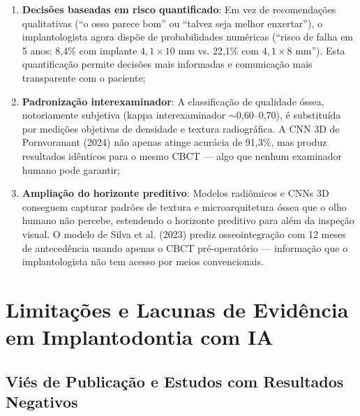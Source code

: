 \begin{enumerate}
    \item \textbf{Decisões baseadas em risco quantificado}: Em vez de recomendações qualitativas (``o osso parece bom'' ou ``talvez seja melhor enxertar''), o implantologista agora dispõe de probabilidades numéricas (``risco de falha em 5 anos: 8,4\% com implante $4,1 \times 10$ mm vs. 22,1\% com $4,1 \times 8$ mm''). Esta quantificação permite decisões mais informadas e comunicação mais transparente com o paciente;

    \item \textbf{Padronização interexaminador}: A classificação de qualidade óssea, notoriamente subjetiva (kappa interexaminador $\sim$0,60--0,70), é substituída por medições objetivas de densidade e textura radiográfica. A CNN 3D de Pornvoranant (2024) não apenas atinge acurácia de 91,3\%, mas produz resultados idênticos para o mesmo CBCT --- algo que nenhum examinador humano pode garantir;

    \item \textbf{Ampliação do horizonte preditivo}: Modelos radiômicos e CNNs 3D conseguem capturar padrões de textura e microarquitetura óssea que o olho humano não percebe, estendendo o horizonte preditivo para além da inspeção visual. O modelo de Silva et al. (2023) prediz osseointegração com 12 meses de antecedência usando apenas o CBCT pré-operatório --- informação que o implantologista não tem acesso por meios convencionais.
\end{enumerate}


\section{Limitações e Lacunas de Evidência em Implantodontia com IA}

\subsection{Viés de Publicação e Estudos com Resultados Negativos}

